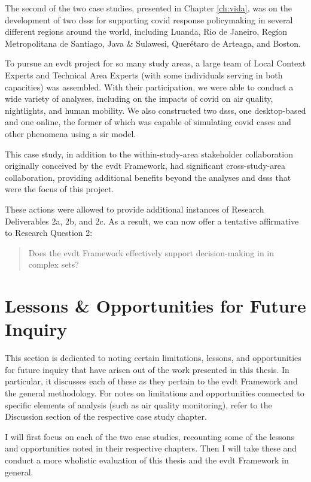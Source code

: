 The second of the two case studies, presented in Chapter \ref{ch:vida}, was on the development of two \acp{dss} for supporting \ac{covid} response policymaking in several different regions around the world, including Luanda, Rio de Janeiro, Regíon Metropolitana de Santiago, Java \& Sulawesi, Querétaro de Arteaga, and Boston. 

To pursue an \ac{evdt} project for so many study areas, a large team of Local Context Experts and Technical Area Experts (with some individuals serving in both capacities) was assembled. With their participation, we were able to conduct a wide variety of analyses, including on the impacts of \ac{covid} on air quality, nightlights, and human mobility. We also constructed two \acp{dss}, one desktop-based and one online, the former of which was capable of simulating \ac{covid} cases and other phenomena using a \acf{sir} model. 

This case study, in addition to the within-study-area stakeholder collaboration originally conceived by the \ac{evdt} Framework, had significant cross-study-area collaboration, providing additional benefits beyond the analyses and \acp{dss} that were the focus of this project. 

These actions were allowed to provide additional instances of Research Deliverables 2a, 2b, and 2c. As a result, we can now offer a tentative affirmative to Research Question 2:

\blockquote{Does the \ac{evdt} Framework effectively support decision-making in in complex \ac{sets}?}

\section{Lessons \& Opportunities for Future Inquiry} \label{sec:future-inquiry}

This section is dedicated to noting certain limitations, lessons, and opportunities for future inquiry that have arisen out of the work presented in this thesis. In particular, it discusses each of these as they pertain to the \ac{evdt} Framework and the general methodology. For notes on limitations and opportunities connected to specific elements of analysis (such as air quality monitoring), refer to the Discussion section of the respective case study chapter.

I will first focus on each of the two case studies, recounting some of the lessons and opportunities noted in their respective chapters. Then I will take these and conduct a more wholistic evaluation of this thesis and the \ac{evdt} Framework in general.

